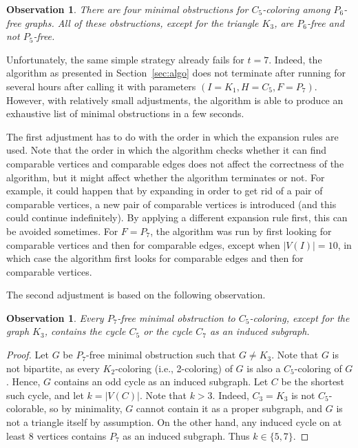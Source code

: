 \documentclass[11pt,a4paper]{article}
\theoremstyle{mystyle}
\newtheorem{observation}[theorem]{Observation}
\begin{document}
\begin{observation}
There are four minimal obstructions for $C_5$-coloring among $P_6$-free graphs.
All of these obstructions, except for the triangle $K_3$, are $P_6$-free and not $P_5$-free.
\end{observation}

Unfortunately, the same simple strategy already fails for $t=7$.
Indeed, the algorithm as presented in Section~\ref{sec:algo} does not terminate after running for several hours after calling it with parameters $(I=K_1, H=C_5, F=P_7)$. However, with relatively small adjustments, the algorithm is able to produce an exhaustive list of minimal obstructions in a few seconds. 

The first adjustment has to do with the order in which the expansion rules are used. Note that the order in which the algorithm checks whether it can find comparable vertices and comparable edges does not affect the correctness of the algorithm, but it might affect whether the algorithm terminates or not. 
For example, it could happen that by expanding in order to get rid of a pair of comparable vertices, a new pair of comparable vertices is introduced (and this could continue indefinitely). By applying a different expansion rule first, this can be avoided sometimes. For $F=P_7$, the algorithm was run by first looking for comparable vertices and then for comparable edges, except when $|V(I)|=10$, in which case the algorithm first looks for comparable edges and then for comparable vertices.

The second adjustment is based on the following observation.

\begin{observation}\label{obs:p7start}
Every $P_7$-free minimal obstruction to $C_5$-coloring, except for the graph $K_3$, contains the cycle $C_5$ or the cycle $C_7$ as an induced subgraph.
\end{observation}
\begin{proof}
Let $G$ be $P_7$-free minimal obstruction such that $G \neq K_3$.
Note that $G$ is not bipartite, as every $K_2$-coloring (i.e., 2-coloring) of $G$ is also a $C_5$-coloring of $G$.
Hence, $G$ contains an odd cycle as an induced subgraph. Let $C$ be the shortest such cycle, and let $k = |V(C)|$.
Note that $k > 3$. Indeed, $C_3 = K_3$ is not $C_5$-colorable, so by minimality, $G$ cannot contain it as a proper subgraph, and $G$ is not a triangle itself by assumption.
On the other hand, any induced cycle on at least $8$ vertices contains $P_7$ as an induced subgraph.
Thus $k \in \{5,7\}$.
\end{proof}
\end{document}
